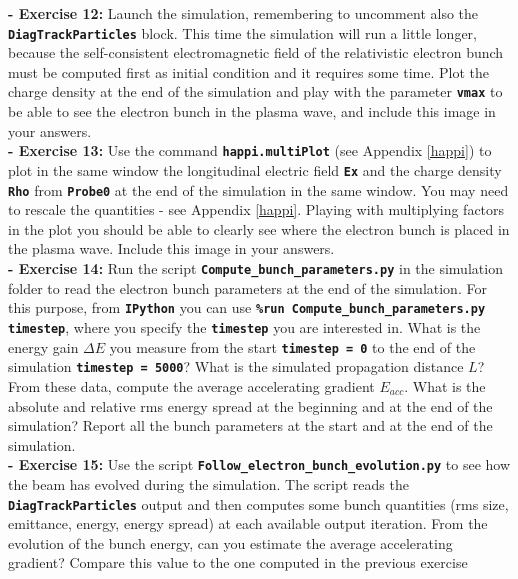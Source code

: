 \documentclass[a4paper,12pt]{extarticle}
\newcommand{\commandline}[1]{\texttt{\textbf{#1}}}
\begin{document}
\textbf{ - Exercise 12:} Launch the simulation, remembering to uncomment also the \commandline{DiagTrackParticles} block. This time the simulation will run a little longer, because the self-consistent electromagnetic field of the relativistic electron bunch must be computed first as initial condition and it requires some time. Plot the charge density at the end  of the simulation and play with the parameter \commandline{vmax} to be able to see the electron bunch in the plasma wave, and include this image in your answers.\\

\textbf{ - Exercise 13:} Use the command \commandline{happi.multiPlot} (see Appendix \ref{happi}) to plot in the same window the longitudinal electric field \commandline{Ex} and the charge density \commandline{Rho} from \commandline{Probe0} at the end of the simulation in the same window. You may need to rescale the quantities - see Appendix \ref{happi}. Playing with multiplying factors in the plot you should be able to clearly see where the electron bunch is placed in the plasma wave. Include this image in your answers.\\

\textbf{ - Exercise 14:} Run the script \commandline{Compute\_bunch\_parameters.py} in the simulation folder to read the electron bunch parameters at the end of the simulation. For this purpose, from \commandline{IPython} you can use \commandline{\%run Compute\_bunch\_parameters.py timestep}, where you specify the \commandline{timestep} you are interested in. What is the energy gain $\Delta E$ you measure from the start \commandline{timestep = 0} to the end of the simulation \commandline{timestep = 5000}? What is the simulated propagation distance $L$? From these data, compute the average accelerating  gradient $E_{acc}$. What is the absolute and relative rms energy spread at the beginning and at the end of the simulation? Report all the bunch parameters at the start and at the end of the simulation.\\

\textbf{ - Exercise 15:} Use the script \commandline{Follow\_electron\_bunch\_evolution.py} to see how the beam has evolved during the simulation. The script reads the \commandline{DiagTrackParticles} output and then computes some bunch quantities (rms size, emittance, energy, energy spread) at each available output iteration. From the evolution of the bunch energy, can you estimate the average accelerating gradient? Compare this value to the one computed in the previous exercise\\
\end{document}
